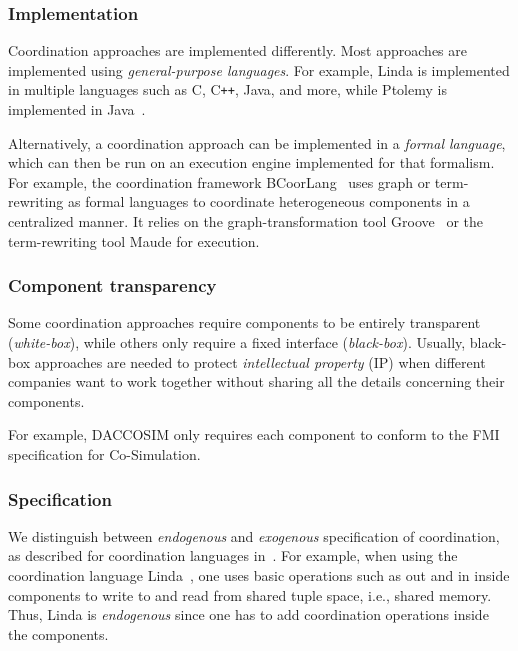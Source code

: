 \documentclass[runningheads]{llncs}
\begin{document}

\subsubsection{Implementation} Coordination approaches are implemented differently.
Most approaches are implemented using \textit{general-purpose languages}.
For example, Linda is implemented in multiple languages such as C, C\texttt{++}, Java, and more, while Ptolemy is implemented in Java~\cite{ptolemaeusSystemDesignModeling2014}. 

Alternatively, a coordination approach can be implemented in a \textit{formal language}, which can then be run on an execution engine implemented for that formalism.
For example, the coordination framework BCoorLang~\cite{krauterBehavioralConsistencyMultimodeling2023} uses graph or term-rewriting as formal languages to coordinate heterogeneous components in a centralized manner.
It relies on the graph-transformation tool Groove~\cite{rensinkGROOVESimulatorTool2004} or the term-rewriting tool Maude for execution.

\subsubsection{Component transparency} Some coordination approaches require components to be entirely transparent (\textit{white-box}), while others only require a fixed interface (\textit{black-box}).
Usually, black-box approaches are needed to protect \textit{intellectual property} (IP) when different companies want to work together without sharing all the details concerning their components.

For example, DACCOSIM only requires each component to conform to the FMI specification for Co-Simulation.

\subsubsection{Specification} We distinguish between \textit{endogenous} and \textit{exogenous} specification of coordination, as described for coordination languages in~\cite{arbabWhatYouMean1998}.
For example, when using the coordination language Linda~\cite{carrieroLindaContext1989}, one uses basic operations such as \textsf{out} and \textsf{in} inside components to write to and read from shared tuple space, i.e., shared memory.
Thus, Linda is \textit{endogenous} since one has to add coordination operations inside the components.
\end{document}
